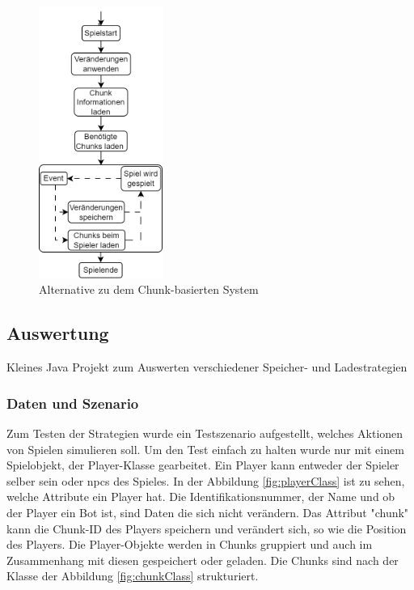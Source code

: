 \begin{figure}[htp]
    \centering
    \includegraphics[width=0.36\textwidth]{images/Chunkbasiert2.png}
    \caption{Alternative zu dem Chunk-basierten System}
    \label{fig:altchunkBasedSystem}
\end{figure}


\subsection{Auswertung}
Kleines Java Projekt zum Auswerten verschiedener Speicher- und Ladestrategien

\subsubsection{Daten und Szenario}
Zum Testen der Strategien wurde ein Testszenario aufgestellt, welches Aktionen von Spielen simulieren soll. Um den Test einfach zu halten wurde nur mit einem Spielobjekt, der Player-Klasse gearbeitet. Ein Player kann entweder der Spieler selber sein oder \acp{npc} des Spieles. In der Abbildung \ref{fig:playerClass} ist zu sehen, welche Attribute ein Player hat. Die Identifikationsnummer, der Name und ob der Player ein Bot ist, sind Daten die sich nicht verändern. Das Attribut "chunk" kann die Chunk-ID des Players speichern und verändert sich, so wie die Position des Players. Die Player-Objekte werden in Chunks gruppiert und auch im Zusammenhang mit diesen gespeichert oder geladen. Die Chunks sind nach der Klasse der Abbildung \ref{fig:chunkClass} strukturiert.

